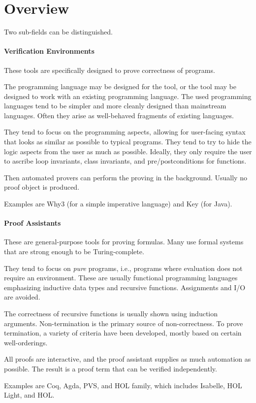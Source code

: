 \section{Overview}

Two sub-fields can be distinguished.

\paragraph{Verification Environments}
These tools are specifically designed to prove correctness of programs.

The programming language may be designed for the tool, or the tool may be designed to work with an existing programming language.
The used programming languages tend to be simpler and more cleanly designed than mainstream languages.
Often they arise as well-behaved fragments of existing languages.

They tend to focus on the programming aspects, allowing for user-facing syntax that looks as similar as possible to typical programs.
They tend to try to hide the logic aspects from the user as much as possible.
Ideally, they only require the user to ascribe loop invariants, class invariants, and pre/postconditions for functions.

Then automated provers can perform the proving in the background.
Usually no proof object is produced.

Examples are Why3 (for a simple imperative language) and Key (for Java).

\paragraph{Proof Assistants}
These are general-purpose tools for proving formulas.
Many use formal systems that are strong enough to be Turing-complete.

They tend to focus on \emph{pure} programs, i.e., programs where evaluation does not require an environment.
These are usually functional programming languages emphasizing inductive data types and recursive functions.
Assignments and I/O are avoided.

The correctness of recursive functions is usually shown using induction arguments.
Non-termination is the primary source of non-correctness.
To prove termination, a variety of criteria have been developed, mostly based on certain well-orderings.

All proofs are interactive, and the proof assistant supplies as much automation as possible.
The result is a proof term that can be verified independently.

Examples are Coq, Agda, PVS, and HOL family, which includes Isabelle, HOL Light, and HOL.